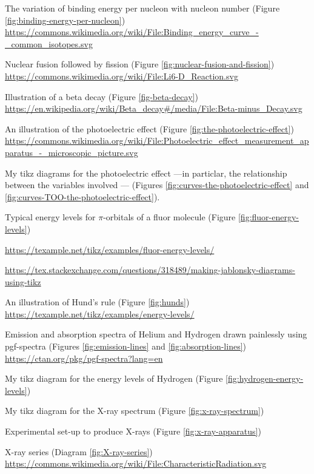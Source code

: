 \documentclass[oneside]{book}
\begin{document}
\begin{enumerate}[label={[\arabic*]}]
    \item\label{source:binding-energy-per-nucleon} The variation of binding energy per nucleon with nucleon number (Figure \ref{fig:binding-energy-per-nucleon}) \url{https://commons.wikimedia.org/wiki/File:Binding_energy_curve_-_common_isotopes.svg}
    \item\label{source:nuclear-fusion-and-fission} 
    Nuclear fusion followed by fission
    (Figure \ref{fig:nuclear-fusion-and-fission}) \url{https://commons.wikimedia.org/wiki/File:Li6-D_Reaction.svg} 
    \item\label{source:beta-decay} Illustration of a beta decay (Figure \ref{fig-beta-decay}) \url{https://en.wikipedia.org/wiki/Beta_decay#/media/File:Beta-minus_Decay.svg}
    \item\label{source:the-photoelectric-effect} An illustration of the photoelectric effect (Figure \ref{fig:the-photoelectric-effect}) \url{https://commons.wikimedia.org/wiki/File:Photoelectric_effect_measurement_apparatus_-_microscopic_picture.svg}
    \item\label{source:curves-the-photoelectric-effect} My tikz diagrams for the photoelectric effect ---in particlar, the relationship between the variables involved --- (Figures \ref{fig:curves-the-photoelectric-effect} and \ref{fig:curves-TOO-the-photoelectric-effect}).
    \item\label{source:fluor-energy-levels} Typical energy levels for \(\pi\)-orbitals of a fluor molecule (Figure \ref{fig:fluor-energy-levels}) 
    
    \url{https://texample.net/tikz/examples/fluor-energy-levels/}

    \url{https://tex.stackexchange.com/questions/318489/making-jablonsky-diagrams-using-tikz}
    \item\label{source:hunds} An illustration of Hund's rule (Figure \ref{fig:hunds}) \url{https://texample.net/tikz/examples/energy-levels/}
    \item\label{source:emission-and-absorption-lines} Emission and absorption spectra of Helium and Hydrogen drawn painlessly using pgf-spectra (Figures \ref{fig:emission-lines} and \ref{fig:absorption-lines}) \url{https://ctan.org/pkg/pgf-spectra?lang=en} 
    \item\label{source:hydrogen-energy-levels} My tikz diagram for the energy levels of Hydrogen (Figure \ref{fig:hydrogen-energy-levels})
    \item\label{source:x-ray-spectrum} My tikz diagram for the X-ray spectrum (Figure \ref{fig:x-ray-spectrum})
    \item\label{source:x-ray-apparatus} Experimental set-up to produce X-rays (Figure \ref{fig:x-ray-apparatus})
    \item\label{source:X-ray-series} X-ray series (Diagram \ref{fig:X-ray-series}) \url{https://commons.wikimedia.org/wiki/File:CharacteristicRadiation.svg}
\end{enumerate}
\end{document}
